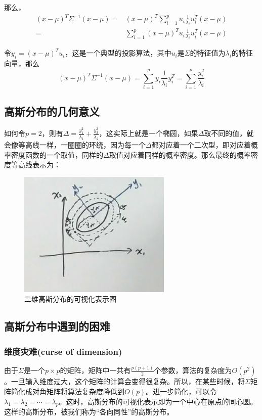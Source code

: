 \documentclass[a4paper]{article}
\numberwithin{equation}{section}
\begin{document}
那么，
\begin{align}
    (x-\mu)^T\Sigma^{-1}(x-\mu) = & (x-\mu)^T\sum_{i=1}^{p}u_i\frac{1}{\lambda_i} u_i^T(x-\mu) \\
    = & \sum_{i=1}^{p} (x-\mu)^Tu_i\frac{1}{\lambda_i} u_i^T(x-\mu)
\end{align}

令$y_i=(x-\mu)^Tu_i$，这是一个典型的投影算法，其中$u_i$是$\Sigma$的特征值为$\lambda_i$的特征向量，那么
\begin{equation}
    (x-\mu)^T\Sigma^{-1}(x-\mu) = \sum_{i=1}^{p} y_i\frac{1}{\lambda_i} y_i^T=\sum_{i=1}^p\frac{y_i^2}{\lambda_i}
\end{equation}

\subsection{高斯分布的几何意义}
如何令$p=2$，则有$\Delta = \frac{y_1^2}{\lambda_1} + \frac{y_2^2}{\lambda_2} $，这实际上就是一个椭圆，如果$\Delta$取不同的值，就会像等高线一样，一圈圈的环绕，因为每一个$\Delta$都对应着一个二次型，即对应着概率密度函数的一个取值，同样的$\Delta$取值对应着同样的概率密度。那么最终的概率密度等高线表示为：
\begin{figure}[H]
    \centering
    \includegraphics[width=.5\textwidth]{20191019203302.png}
    \caption{二维高斯分布的可视化表示图}
    \label{fig:my_label_1}
\end{figure}


\subsection{高斯分布中遇到的困难}
\subsubsection{维度灾难(curse of dimension)}
由于$\Sigma$是一个$p\times p$的矩阵，矩阵中一共有$\frac{p(p+1)}{2}$个参数，算法的复杂度为$O(p^2)$。一旦输入维度过大，这个矩阵的计算会变得很复杂。所以，在某些时候，将$\Sigma$矩阵简化成对角矩阵将算法复杂度降低到$O(p)$。进一步简化，可以令$\lambda_1=\lambda_2=\cdots=\lambda_p$。这时，高斯分布的可视化表示即为一个中心在原点的同心圆。这样的高斯分布，被我们称为“各向同性”的高斯分布。
\end{document}
